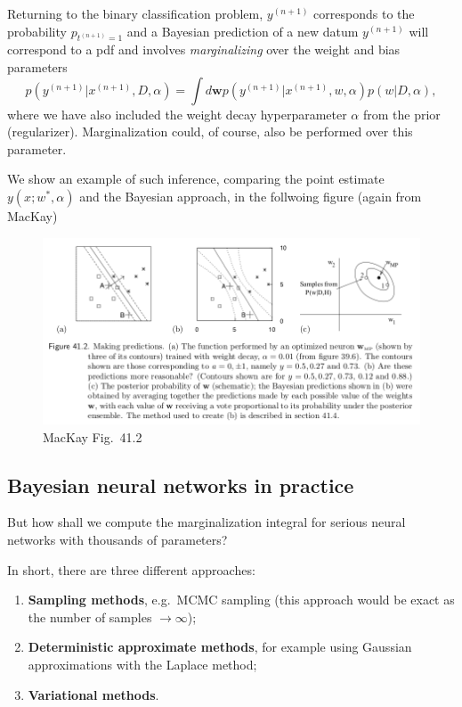 \documentclass[%
oneside,                 %
final,                   %
10pt]{article}
\begin{document}
Returning to the binary classification problem, $y^{(n+1)}$ corresponds to the probability $p_{t^{(n+1)}=1}$ and a Bayesian prediction of a new datum $y^{(n+1)}$ will correspond to a pdf and involves \emph{marginalizing} over the weight and bias parameters
\[ p(y^{(n+1)} | x^{(n+1)}, D, \alpha) = \int d \boldsymbol{w} p( y^{(n+1)} | x^{(n+1)}, w, \alpha) p(w|D,\alpha), \]
where we have also included the weight decay hyperparameter $\alpha$ from the prior (regularizer). Marginalization could, of course, also be performed over this parameter.

We show an example of such inference, comparing the point estimate $y(x; w^*, \alpha)$ and the Bayesian approach, in the follwoing figure (again from MacKay)


\begin{figure}[!ht]  %
  \centerline{\includegraphics[width=0.8\linewidth]{fig/MacKay_41_2.png}}
  \caption{
  MacKay Fig.~41.2
  }
\end{figure}


\subsection{Bayesian neural networks in practice}
But how shall we compute the marginalization integral for serious neural networks with thousands of parameters?

In short, there are three different approaches:

\begin{enumerate}
\item \textbf{Sampling methods}, e.g.~MCMC sampling (this approach would be exact as the number of samples $\rightarrow \infty$);

\item \textbf{Deterministic approximate methods}, for example using Gaussian approximations with the Laplace method;

\item \textbf{Variational methods}.
\end{enumerate}
\end{document}
